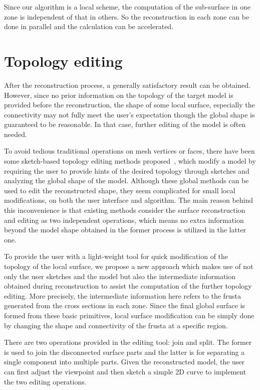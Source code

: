 Since our algorithm is a local scheme, the  computation of the
sub-surface in one zone is independent of that in others. So the
reconstruction in each zone can be done in parallel and the
calculation can be accelerated.



\section{Topology editing}
\label{ch6:sec:edit}

After the reconstruction  process, a generally satisfactory result
can be obtained. However, since no prior information on the topology
of the target model is provided before the reconstruction, the shape
of some local surface, especially the connectivity may not fully
meet the user's expectation though the global shape is guaranteed to
be reasonable. In that case, further editing of the model is often
needed.

To avoid tedious traditional  operations on mesh vertices or faces,
there have been some sketch-based topology editing methods
proposed~\cite{HRABV11,JT09,JZH07}, which modify a model by
requiring the user to provide hints of the desired topology through
sketches and analyzing the global shape of the model. Although these
global methods can be used to edit the reconstructed shape, they
seem complicated for small local modifications, on both the user
interface and algorithm. The main reason behind this inconvenience
is that existing methods consider the surface reconstruction and
editing as two independent operations, which means no extra
information beyond the model shape obtained in the former process is
utilized in the latter one.

To provide the user with a light-weight tool for quick modification of
the topology of the local surface, we propose a new approach which
makes use of not only the user sketches and the model but also the
intermediate information obtained during reconstruction to assist
the computation of the further topology editing. More precisely, the
intermediate information here refers to the frusta generated from
the cross sections in each zone. Since the final global surface is
formed from these basic primitives, local surface modification can
be simply done by changing the shape and connectivity of the frusta
at a specific region.

There are two operations provided in  the editing tool: join and
split. The former is used to join the disconnected surface parts and
the latter is for separating a single component into multiple parts.
Given the reconstructed model, the user can first adjust the
viewpoint and then sketch a simple 2D curve to implement the two
editing operations.



